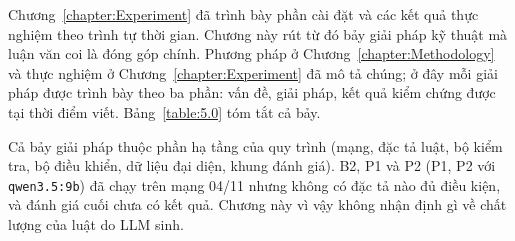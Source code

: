 \documentclass[../main.tex]{subfiles}
\begin{document}

Chương~\ref{chapter:Experiment} đã trình bày phần cài đặt và các kết quả thực nghiệm theo trình tự thời gian. Chương này rút từ đó bảy giải pháp kỹ thuật mà luận văn coi là đóng góp chính. Phương pháp ở Chương~\ref{chapter:Methodology} và thực nghiệm ở Chương~\ref{chapter:Experiment} đã mô tả chúng; ở đây mỗi giải pháp được trình bày theo ba phần: vấn đề, giải pháp, kết quả kiểm chứng được tại thời điểm viết. Bảng~\ref{table:5.0} tóm tắt cả bảy.

Cả bảy giải pháp thuộc phần hạ tầng của quy trình (mạng, đặc tả luật, bộ kiểm tra, bộ điều khiển, dữ liệu đại diện, khung đánh giá). B2, P1 và P2 (P1, P2 với \texttt{qwen3.5:9b}) đã chạy trên mạng 04/11 nhưng không có đặc tả nào đủ điều kiện, và đánh giá cuối chưa có kết quả. Chương này vì vậy không nhận định gì về chất lượng của luật do LLM sinh.
\end{document}
